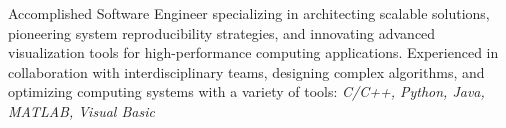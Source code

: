\documentclass{resume} %
\begin{document}

\begin{rSection}{}
Accomplished Software Engineer specializing in architecting scalable solutions, pioneering system reproducibility strategies, and innovating advanced visualization tools for high-performance computing applications. Experienced in collaboration with interdisciplinary teams, designing complex algorithms, and optimizing computing systems with a variety of tools: 
\it{C/C++, Python, Java, MATLAB, Visual Basic}



\end{rSection}

\end{document}

